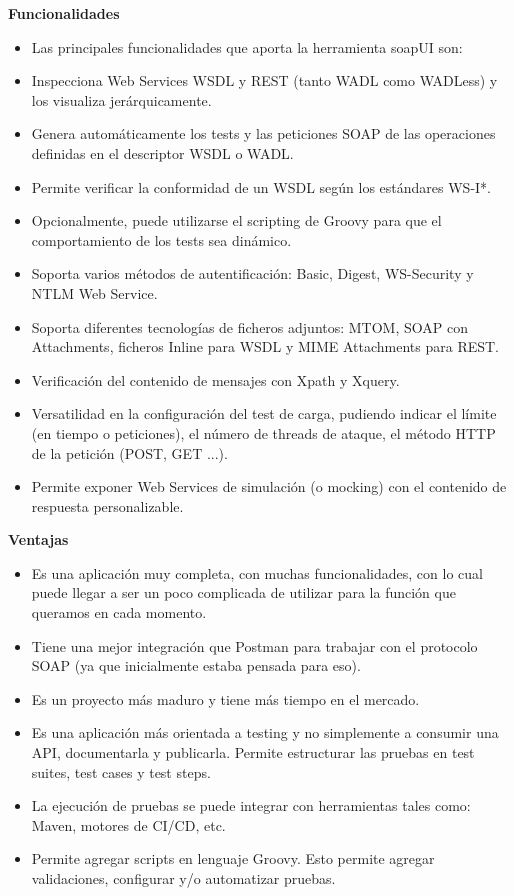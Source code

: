 \documentclass[twocolumn]{article}
\begin{document}
\newpage
\textbf{Funcionalidades}
\begin{itemize}
\item Las principales funcionalidades que aporta la herramienta soapUI son:

\item Inspecciona Web Services WSDL y REST (tanto WADL como WADLess) y los visualiza jerárquicamente.
\item Genera automáticamente los tests y las peticiones SOAP de las operaciones definidas en el descriptor WSDL o WADL.
\item Permite verificar la conformidad de un WSDL según los estándares WS-I*.
\item Opcionalmente, puede utilizarse el scripting de Groovy para que el comportamiento de los tests sea dinámico.
\item Soporta varios métodos de autentificación: Basic, Digest, WS-Security y NTLM Web Service.
\item Soporta diferentes tecnologías de ficheros adjuntos: MTOM, SOAP con Attachments, ficheros Inline para WSDL y MIME Attachments para REST.
\item Verificación del contenido de mensajes con Xpath y Xquery.
\item Versatilidad en la configuración del test de carga, pudiendo indicar el límite (en tiempo o peticiones), el número de threads de ataque, el método HTTP de la petición (POST, GET ...).
\item Permite exponer Web Services de simulación (o mocking) con el contenido de respuesta personalizable.
\end{itemize}
\newpage
\textbf{Ventajas}
\begin{itemize}
\item Es una aplicación muy completa, con muchas funcionalidades, con lo cual puede llegar a ser un poco complicada de utilizar para la función que queramos en cada momento.
\item Tiene una mejor integración que Postman para trabajar con el protocolo SOAP (ya que inicialmente estaba pensada para eso).
\item Es un proyecto más maduro y tiene más tiempo en el mercado.
\item Es una aplicación más orientada a testing y no simplemente a consumir una API, documentarla y publicarla. Permite estructurar las pruebas en test suites, test cases y test steps.
\item La ejecución de pruebas se puede integrar con herramientas tales como: Maven, motores de CI/CD, etc.
\item Permite agregar scripts en lenguaje Groovy. Esto permite agregar validaciones, configurar y/o automatizar pruebas.
\end{itemize}
\end{document}
